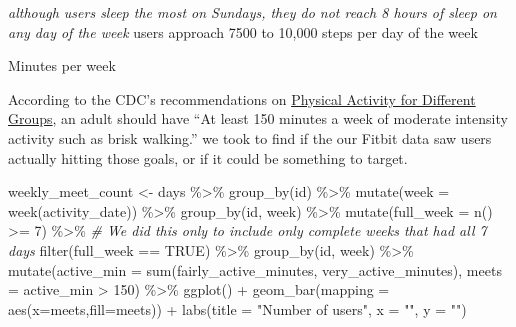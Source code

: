 \documentclass[
]{article}
\newenvironment{Shaded}{\begin{snugshade}}{\end{snugshade}}
\newcommand{\AttributeTok}[1]{\textcolor[rgb]{0.77,0.63,0.00}{#1}}
\newcommand{\CommentTok}[1]{\textcolor[rgb]{0.56,0.35,0.01}{\textit{#1}}}
\newcommand{\ConstantTok}[1]{\textcolor[rgb]{0.00,0.00,0.00}{#1}}
\newcommand{\DecValTok}[1]{\textcolor[rgb]{0.00,0.00,0.81}{#1}}
\newcommand{\FunctionTok}[1]{\textcolor[rgb]{0.00,0.00,0.00}{#1}}
\newcommand{\NormalTok}[1]{#1}
\newcommand{\OtherTok}[1]{\textcolor[rgb]{0.56,0.35,0.01}{#1}}
\newcommand{\SpecialCharTok}[1]{\textcolor[rgb]{0.00,0.00,0.00}{#1}}
\newcommand{\StringTok}[1]{\textcolor[rgb]{0.31,0.60,0.02}{#1}}
\begin{document}
\emph{although users sleep the most on Sundays, they do not reach 8
hours of sleep on any day of the week }users approach 7500 to 10,000
steps per day of the week

Minutes per week

According to the CDC's recommendations on
\href{https://www.cdc.gov/physicalactivity/basics/age-chart.html}{Physical
Activity for Different Groups}, an adult should have ``At least 150
minutes a week of moderate intensity activity such as brisk walking.''
we took to find if the our Fitbit data saw users actually hitting those
goals, or if it could be something to target.

\begin{Shaded}
\begin{Highlighting}[]
\NormalTok{weekly\_meet\_count }\OtherTok{\textless{}{-}}\NormalTok{ days }\SpecialCharTok{\%\textgreater{}\%}
  \FunctionTok{group\_by}\NormalTok{(id) }\SpecialCharTok{\%\textgreater{}\%}
  \FunctionTok{mutate}\NormalTok{(}\AttributeTok{week =} \FunctionTok{week}\NormalTok{(activity\_date)) }\SpecialCharTok{\%\textgreater{}\%}
  \FunctionTok{group\_by}\NormalTok{(id, week) }\SpecialCharTok{\%\textgreater{}\%}
  \FunctionTok{mutate}\NormalTok{(}\AttributeTok{full\_week =} \FunctionTok{n}\NormalTok{() }\SpecialCharTok{\textgreater{}=} \DecValTok{7}\NormalTok{) }\SpecialCharTok{\%\textgreater{}\%}          \CommentTok{\# We did this only to include only complete weeks that had all 7 days}
  \FunctionTok{filter}\NormalTok{(full\_week }\SpecialCharTok{==} \ConstantTok{TRUE}\NormalTok{) }\SpecialCharTok{\%\textgreater{}\%}
  \FunctionTok{group\_by}\NormalTok{(id, week) }\SpecialCharTok{\%\textgreater{}\%}
  \FunctionTok{mutate}\NormalTok{(}\AttributeTok{active\_min =} \FunctionTok{sum}\NormalTok{(fairly\_active\_minutes, very\_active\_minutes),}
            \AttributeTok{meets =}\NormalTok{ active\_min }\SpecialCharTok{\textgreater{}} \DecValTok{150}\NormalTok{) }\SpecialCharTok{\%\textgreater{}\%}
  \FunctionTok{ggplot}\NormalTok{() }\SpecialCharTok{+} \FunctionTok{geom\_bar}\NormalTok{(}\AttributeTok{mapping =} \FunctionTok{aes}\NormalTok{(}\AttributeTok{x=}\NormalTok{meets,}\AttributeTok{fill=}\NormalTok{meets)) }\SpecialCharTok{+}
  \FunctionTok{labs}\NormalTok{(}\AttributeTok{title =} \StringTok{"Number of users"}\NormalTok{, }\AttributeTok{x =} \StringTok{""}\NormalTok{, }\AttributeTok{y =} \StringTok{""}\NormalTok{)}


\end{Highlighting}
\end{Shaded}
\end{document}

